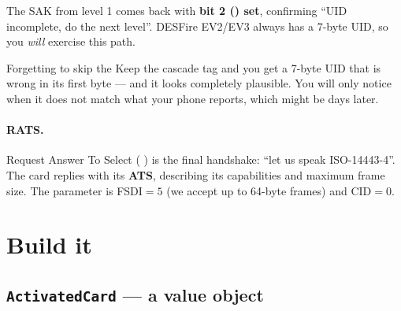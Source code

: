 The SAK from level 1 comes back with \textbf{bit 2 () set},
confirming ``UID incomplete, do the next level''. DESFire EV2/EV3 always has a
7-byte UID, so you \emph{will} exercise this path.

\begin{trap}{Forgetting to skip the }
Keep the cascade tag and you get a 7-byte UID that is wrong in its first byte
--- and it looks completely plausible. You will only notice when it does not
match what your phone reports, which might be days later.
\end{trap}

\paragraph{RATS.} Request Answer To Select ( ) is the final
handshake: ``let us speak ISO-14443-4''. The card replies with its \textbf{ATS},
describing its capabilities and maximum frame size. The  parameter is
FSDI${}=5$ (we accept up to 64-byte frames) and CID${}=0$.

\section{Build it}

\subsection{\texttt{ActivatedCard} --- a value object}

